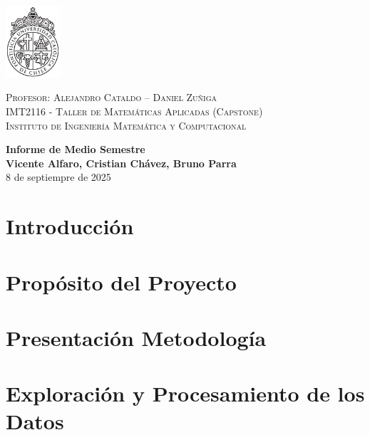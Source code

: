 \documentclass[a4paper, 12pt]{article} %
\newcommand{\departamento}{Instituto de Ingeniería Matemática y Computacional }
\newcommand{\ramo}{Taller de Matemáticas Aplicadas (Capstone) }
\newcommand{\sigla}{IMT2116 }
\newcommand{\titulo}{Informe de Medio Semestre }
\newcommand{\profe}{Alejandro Cataldo -- Daniel Zuñiga }
\newcommand{\nombre}{Vicente Alfaro, Cristian Chávez, Bruno Parra}
\begin{document}
\thispagestyle{empty} %
\begin{minipage}{2cm}
\vspace{-1.5cm}
\includegraphics[width=2cm]{images/logo.pdf}
\vspace{-1.4cm}
\end{minipage}
\begin{minipage}{\linewidth}
\raggedright \footnotesize
\textsc{Profesor: \profe\\
\sigla - \ramo \\
\departamento}
\end{minipage}
\vspace{0.5cm}


\vspace*{8cm}
\begin{center} 
	{\huge \bf \titulo}\\
	\vspace{2mm}
	{\bf \nombre}\\
        \vspace{1mm}
        {8 de septiempre de 2025}
\end{center}
\newpage

\section{Introducción}


\section{Propósito del Proyecto}


\section{Presentación Metodología}


\section{Exploración y Procesamiento de los Datos}

\end{document}
